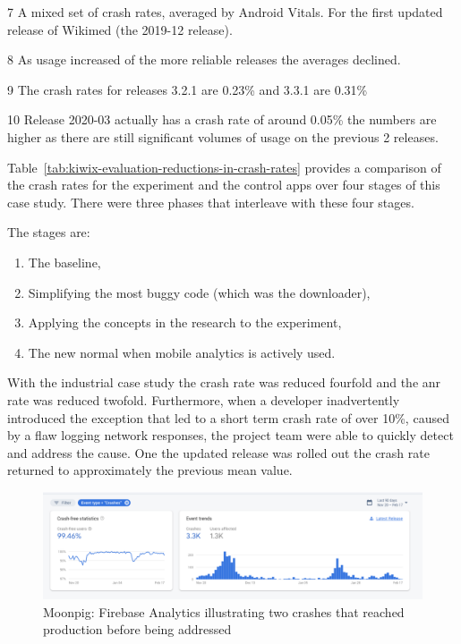 \begin{table}
\begin{center}
\begin{threeparttable}
\begin{tablenotes}
  \item[7] A mixed set of crash rates, averaged by Android Vitals. For the first updated release of Wikimed (the 2019-12 release).
  \item[8] As usage increased of the more reliable releases the averages declined.
  \item[9] The crash rates for releases 3.2.1 are 0.23\% and 3.3.1 are 0.31\%
  \item[10] Release 2020-03 actually has a crash rate of around 0.05\% the numbers are higher as there are still significant volumes of usage on the previous 2 releases.
\end{tablenotes}
\end{threeparttable}
\end{center}
\label{tab:kiwix-evaluation-reductions-in-crash-rates}
\end{table}

Table~\ref{tab:kiwix-evaluation-reductions-in-crash-rates} provides a comparison of the crash rates for the experiment and the control apps over four stages of this case study. There were three phases that interleave with these four stages.

The stages are:
\begin{enumerate}
    \itemsep0em
    \item The baseline,
    \item Simplifying the most buggy code (which was the downloader),
    \item Applying the concepts in the research to the experiment,
    \item The new normal when mobile analytics is actively used.
\end{enumerate}

With the  industrial case study the crash rate was reduced fourfold and the \Gls{anr} rate was reduced twofold. 
Furthermore, when a developer inadvertently introduced the exception that led to a short term crash rate of over 10\%, caused by a flaw logging  network responses, the project team were able to quickly detect and address the cause. One the updated release was rolled out the crash rate returned to approximately the previous mean value.  

\begin{figure}
    \centering
    \includegraphics[width=\linewidth]{images/moonpig/firebase_crash_graph_90_days_feb_2020.pdf}
    \caption{Moonpig: Firebase Analytics illustrating two crashes that reached production before being addressed}
    \label{fig:moonpig-firebase-analytics-two-rogue-crashes}
\end{figure}

